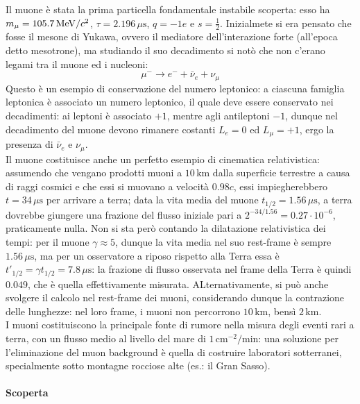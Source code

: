 Il muone è stata la prima particella fondamentale instabile scoperta: esso ha $ m_{\mu} = 105.7\,\mathrm{MeV}/c^2 $, $ \tau = 2.196\,\mu\text{s} $, $ q = -1e $ e $ s = \frac{1}{2} $. Inizialmete si era pensato che fosse il mesone di Yukawa, ovvero il mediatore dell'interazione forte (all'epoca detto mesotrone), ma studiando il suo decadimento si notò che non c'erano legami tra il muone ed i nucleoni:
\begin{equation*}
	\mu^- \rightarrow e^- + \bar{\nu}_e + \nu_{\mu}
\end{equation*}
Questo è un esempio di conservazione del numero leptonico: a ciascuna famiglia leptonica è associato un numero leptonico, il quale deve essere conservato nei decadimenti: ai leptoni è associato $ +1 $, mentre agli antileptoni $ -1 $, dunque nel decadimento del muone devono rimanere costanti $ L_e = 0 $ ed $ L_{\mu} = +1 $, ergo la presenza di $ \bar{\nu}_e $ e $ \nu_{\mu} $.\\
Il muone costituisce anche un perfetto esempio di cinematica relativistica: assumendo che vengano prodotti muoni a $ 10\,\text{km} $ dalla superficie terrestre a causa di raggi cosmici e che essi si muovano a velocità $ 0.98c $, essi impiegherebbero $ t = 34\,\mu\text{s} $ per arrivare a terra; data la vita media del muone $ t_{1/2} = 1.56\,\mu\text{s} $, a terra dovrebbe giungere una frazione del flusso iniziale pari a $ 2^{-34/1.56} = 0.27\cdot10^{-6} $, praticamente nulla. Non si sta però contando la dilatazione relativistica dei tempi: per il muone $ \gamma \approx 5 $, dunque la vita media nel suo rest-frame è sempre $ 1.56\,\mu\text{s} $, ma per un osservatore a riposo rispetto alla Terra essa è $ t'_{1/2} = \gamma t_{1/2} = 7.8\,\mu\text{s} $: la frazione di flusso osservata nel frame della Terra è quindi $ 0.049 $, che è quella effettivamente misurata. ALternativamente, si può anche svolgere il calcolo nel rest-frame dei muoni, considerando dunque la contrazione delle lunghezze: nel loro frame, i muoni non percorrono $ 10\,\text{km} $, bensì $ 2\,\text{km} $.\\
I muoni costituiscono la principale fonte di rumore nella misura degli eventi rari a terra, con un flusso medio al livello del mare di $ 1\,\text{cm}^{-2} / \text{min} $: una soluzione per l'eliminazione del muon background è quella di costruire laboratori sotterranei, specialmente sotto montagne rocciose alte (es.: il Gran Sasso).

\paragraph{Scoperta}

